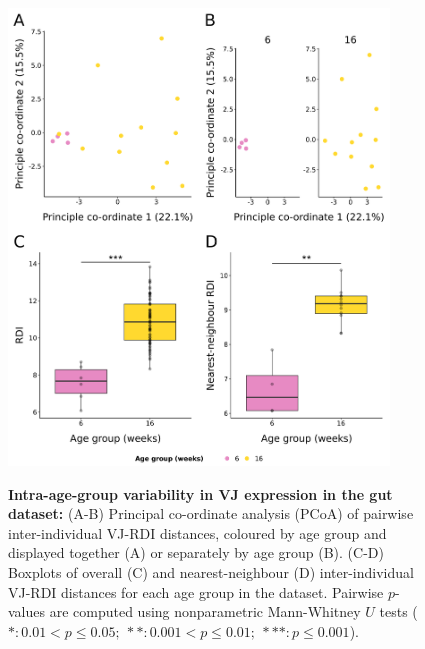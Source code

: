 \begin{figure}
\centering
\includegraphics[width = 0.9\textwidth]{_Figures/png/igseq-gut-rdi-VJ-individual-age}
\begin{subfigure}{0em}
\label{fig:igseq-gut-rdi-VJ-individual-age-pcoa-all}
\end{subfigure}
\begin{subfigure}{0em}
\label{fig:igseq-gut-rdi-VJ-individual-age-pcoa-facet}
\end{subfigure}
\begin{subfigure}{0em}
\label{fig:igseq-gut-rdi-VJ-individual-age-groupdist-all}
\end{subfigure}
\begin{subfigure}{0em}
\label{fig:igseq-gut-rdi-VJ-individual-age-groupdist-nn}
\end{subfigure}
\caption[Intra-age-group variability in VJ expression in the \igseq gut dataset]{\textbf{Intra-age-group variability in VJ expression in the \igseq gut dataset:} (A-B) Principal co-ordinate analysis (PCoA) of pairwise inter-individual VJ-RDI distances, coloured by age group and displayed together (A) or separately by age group (B). (C-D) Boxplots of overall (C) and nearest-neighbour (D) inter-individual VJ-RDI distances for each age group in the dataset. Pairwise $p$-values are computed using nonparametric Mann-Whitney $U$ tests ($*: 0.01 < p \leq 0.05;~**: 0.001 < p \leq 0.01;~***: p \leq 0.001$).}
\label{fig:igseq-gut-rdi-VJ-individual-age}
\end{figure}

